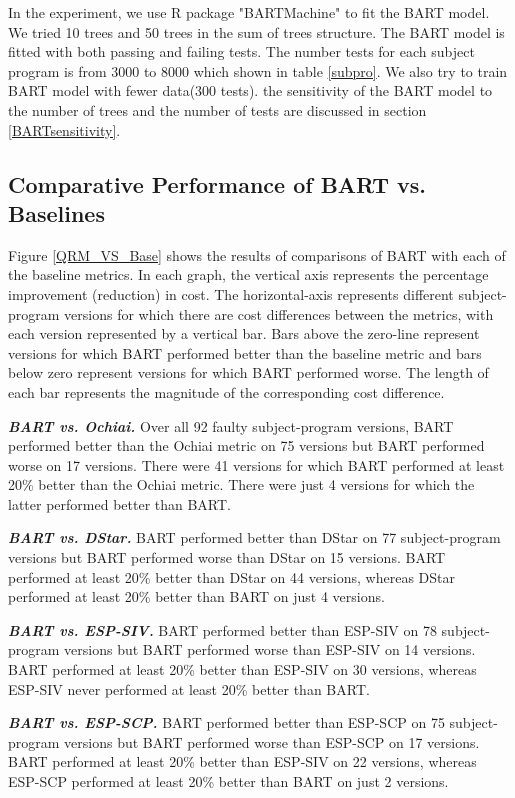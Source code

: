 In the experiment, we use R package "BARTMachine" \cite{} to fit the BART model. We tried 10 trees and 50 trees in the sum of trees structure.  The BART model is fitted with both passing and failing tests. The number tests for each subject program is from 3000 to 8000 which shown in table \ref{subpro}. We also try to train BART model with fewer data(300 tests). the sensitivity of the BART model to the number of trees and the number of tests are discussed in section \ref{BARTsensitivity}.

\subsection{Comparative Performance of BART vs. Baselines}

Figure \ref{QRM_VS_Base} shows the results of comparisons of BART with each of the baseline metrics.  In each graph, the vertical axis represents the percentage improvement (reduction) in cost. The horizontal-axis represents different subject-program versions for which there are cost differences between the metrics, with each version represented by a vertical bar.   Bars above the zero-line represent versions for which BART performed better than the baseline metric and bars below zero represent versions for which BART performed worse.  The length of each bar represents the magnitude of the corresponding cost difference.

\textit{\textbf{ BART vs. Ochiai.}}  Over all 92 faulty subject-program versions, BART performed better than the Ochiai metric on 75 versions but BART performed worse on 17 versions.  There were 41 versions for which BART performed at least 20\% better than the Ochiai metric.  There were just 4 versions for which the latter performed better than BART.

\textit{\textbf{ BART vs. DStar.}}  BART performed better than DStar on 77 subject-program versions but BART performed worse than DStar on 15 versions.  BART performed at least 20\% better than DStar on 44 versions, whereas DStar performed at least 20\% better than BART on just 4 versions.

\textit{\textbf{ BART vs. ESP-SIV.}} BART performed better than ESP-SIV on 78 subject-program versions but BART performed worse than ESP-SIV on 14 versions.  BART performed at least 20\% better than ESP-SIV on 30 versions, whereas ESP-SIV never performed at least 20\% better than BART.

\textit{\textbf{ BART vs. ESP-SCP.}}  BART performed better than ESP-SCP on 75 subject-program versions but BART performed worse than ESP-SCP on 17 versions.  BART performed at least 20\% better than ESP-SIV on 22 versions, whereas ESP-SCP performed at least 20\% better than BART on just 2 versions.

